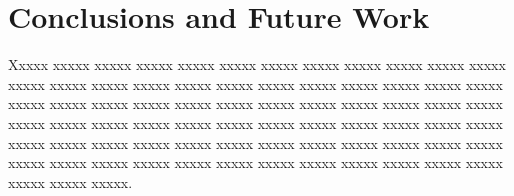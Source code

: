 \documentclass[conference]{IEEEtran}
\begin{document}
\section{Conclusions and Future Work}
\label{sec:conclusion}
Xxxxx xxxxx xxxxx  xxxxx  xxxxx  xxxxx  xxxxx  xxxxx  xxxxx  xxxxx  xxxxx  xxxxx  xxxxx  xxxxx  xxxxx  xxxxx  xxxxx  xxxxx  xxxxx  xxxxx  xxxxx  xxxxx  xxxxx  xxxxx  xxxxx  xxxxx  xxxxx  xxxxx  xxxxx  xxxxx  xxxxx  xxxxx  xxxxx  xxxxx  xxxxx  xxxxx  xxxxx  xxxxx  xxxxx  xxxxx  xxxxx  xxxxx  xxxxx  xxxxx  xxxxx  xxxxx  xxxxx  xxxxx  xxxxx  xxxxx  xxxxx  xxxxx  xxxxx  xxxxx  xxxxx  xxxxx  xxxxx  xxxxx  xxxxx  xxxxx  xxxxx  xxxxx  xxxxx  xxxxx  xxxxx  xxxxx  xxxxx  xxxxx  xxxxx  xxxxx  xxxxx  xxxxx  xxxxx  xxxxx  xxxxx.





\end{document}
